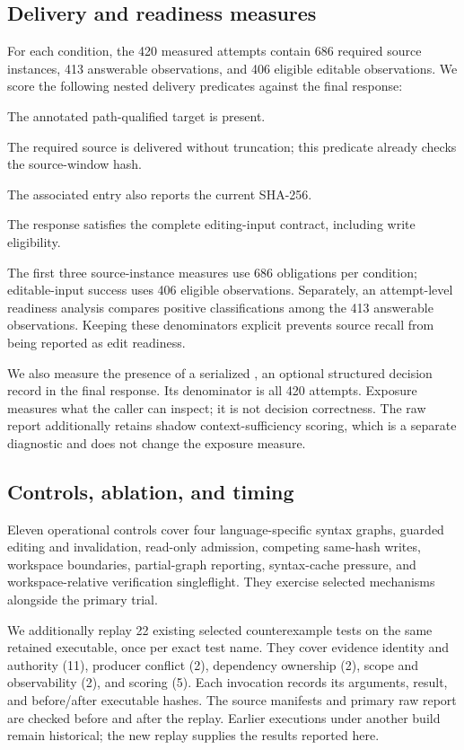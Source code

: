 \subsection{Delivery and readiness measures}
For each condition, the 420 measured attempts contain 686 required source instances, 413 answerable observations, and 406 eligible editable observations. We score the following nested delivery predicates against the final response:
\begin{description}[style=unboxed,leftmargin=0pt,font=\bfseries]
\item[Identity.] The annotated path-qualified target is present.
\item[Original body.] The required source is delivered without truncation; this predicate already checks the source-window hash.
\item[File metadata.] The associated  entry also reports the current SHA-256.
\item[Editable input.] The response satisfies the complete editing-input contract, including write eligibility.
\end{description}
The first three source-instance measures use 686 obligations per condition; editable-input success uses 406 eligible observations. Separately, an attempt-level readiness analysis compares positive classifications among the 413 answerable observations. Keeping these denominators explicit prevents source recall from being reported as edit readiness.

We also measure the presence of a serialized , an optional structured decision record in the final response. Its denominator is all 420 attempts. Exposure measures what the caller can inspect; it is not decision correctness. The raw report additionally retains shadow context-sufficiency scoring, which is a separate diagnostic and does not change the exposure measure.

\subsection{Controls, ablation, and timing}
Eleven operational controls cover four language-specific syntax graphs, guarded editing and invalidation, read-only admission, competing same-hash writes, workspace boundaries, partial-graph reporting, syntax-cache pressure, and workspace-relative verification singleflight. They exercise selected mechanisms alongside the primary trial.

We additionally replay 22 existing selected counterexample tests on the same retained executable, once per exact test name. They cover evidence identity and authority (11), producer conflict (2), dependency ownership (2), scope and observability (2), and scoring (5). Each invocation records its arguments, result, and before/after executable hashes. The source manifests and primary raw report are checked before and after the replay. Earlier executions under another build remain historical; the new replay supplies the results reported here.

